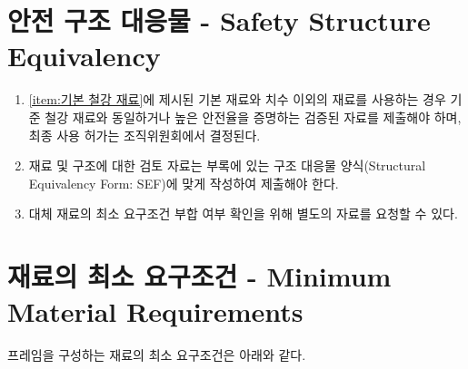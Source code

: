 \documentclass[final,a4paper,10pt]{report}
\begin{document}
\section{안전 구조 대응물 - Safety Structure Equivalency} \label{section:안전 구조 대응물}
\begin{enumerate}
  \item \cref{item:기본 철강 재료}에 제시된 기본 재료와 치수 이외의 재료를 사용하는 경우 기준 철강 재료와 동일하거나 높은 안전율을 증명하는 검증된 자료를 제출해야 하며, 최종 사용 허가는 조직위원회에서 결정된다.
  \item 재료 및 구조에 대한 검토 자료는 부록에 있는 구조 대응물 양식(Structural Equivalency Form: SEF)에 맞게 작성하여 제출해야 한다.
  \item 대체 재료의 최소 요구조건 부합 여부 확인을 위해 별도의 자료를 요청할 수 있다.
\end{enumerate}

\section{재료의 최소 요구조건 - Minimum Material Requirements} \label{section:재료의 최소 요구조건}
프레임을 구성하는 재료의 최소 요구조건은 아래와 같다. 
\end{document}
